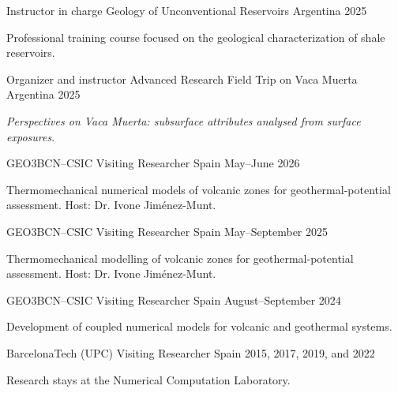 
\begin{cventries}

\cventry
    {Instructor in charge}
    {Geology of Unconventional Reservoirs}
    {Argentina}
    {2025}
    {
      \begin{cvitems}
        \item {Professional training course focused on the geological characterization of shale reservoirs.}
      \end{cvitems}
    }

\cventry
    {Organizer and instructor}
    {Advanced Research Field Trip on Vaca Muerta}
    {Argentina}
    {2025}
    {
      \begin{cvitems}
        \item {\emph{Perspectives on Vaca Muerta: subsurface attributes analysed from surface exposures}.}
      \end{cvitems}
    }

\end{cventries}


\begin{cventries}

\cventry
    {GEO3BCN--CSIC}
    {Visiting Researcher}
    {Spain}
    {May--June 2026}
    {
      \begin{cvitems}
        \item {Thermomechanical numerical models of volcanic zones for geothermal-potential assessment. Host: Dr. Ivone Jiménez-Munt.}
      \end{cvitems}
    }

\cventry
    {GEO3BCN--CSIC}
    {Visiting Researcher}
    {Spain}
    {May--September 2025}
    {
      \begin{cvitems}
        \item {Thermomechanical modelling of volcanic zones for geothermal-potential assessment. Host: Dr. Ivone Jiménez-Munt.}
      \end{cvitems}
    }

\cventry
    {GEO3BCN--CSIC}
    {Visiting Researcher}
    {Spain}
    {August--September 2024}
    {
      \begin{cvitems}
        \item {Development of coupled numerical models for volcanic and geothermal systems.}
      \end{cvitems}
    }

\cventry
    {BarcelonaTech (UPC)}
    {Visiting Researcher}
    {Spain}
    {2015, 2017, 2019, and 2022}
    {
      \begin{cvitems}
        \item {Research stays at the Numerical Computation Laboratory.}
      \end{cvitems}
    }

\end{cventries}
